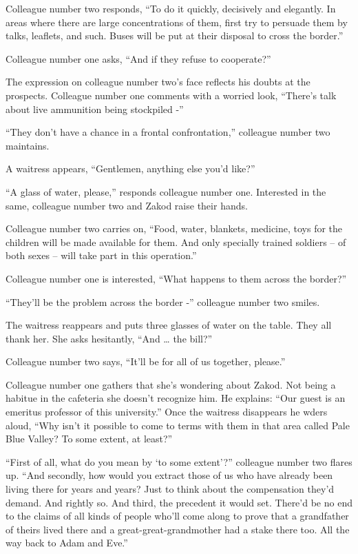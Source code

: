 \documentclass[twoside,11pt]{book}
\begin{document}
Colleague number two responds, ``To do it quickly, decisively and elegantly. In areas where there are large
concentrations of them, first try to persuade them by talks, leaflets, and such. Buses will be put at their disposal to
cross the border.''

Colleague number one asks, ``And if they refuse to cooperate?''

The expression on colleague number two's face reflects his doubts at the prospects. Colleague number one comments with a
worried look, ``There's talk about live ammunition being stockpiled -''

``They don't have a chance in a frontal confrontation,'' colleague number two maintains.

A waitress appears, ``Gentlemen, anything else you'd like?''

``A glass of water, please,'' responds colleague number one. Interested in the same, colleague
number two and Zakod raise their hands.

Colleague number two carries on, ``Food, water, blankets, medicine, toys for the children will be made
available for them.  And only specially trained soldiers -- of both sexes -- will take part in this
operation.''

Colleague number one is interested, ``What happens to them across the border?''

``They'll be the problem across the border -'' colleague number two smiles.

The waitress reappears and puts three glasses of water on the table. They all thank her. She asks hesitantly,
``And {\dots} the bill?''

Colleague number two says, ``It'll be for all of us together, please.''

Colleague number one gathers that she's wondering about Zakod. Not being a habitue in the cafeteria she doesn't
recognize him. He explains: ``Our guest is an emeritus professor of this university.'' Once
the waitress disappears he wders aloud, ``Why isn't it possible to come to terms with them in that area
called Pale Blue Valley? To some extent, at least?''

``First of all, what do you mean by `to some extent'?'' colleague number two flares up.
``And secondly, how would you extract those of us who have already been living there for years and
years? Just to think about the compensation they'd demand. And rightly so. And third, the precedent it would set.
There'd be no end to the claims of all kinds of people who'll come along to prove that a grandfather of theirs lived
there and a great-great-grandmother had a stake there too. All the way back to Adam and Eve.''
\end{document}
